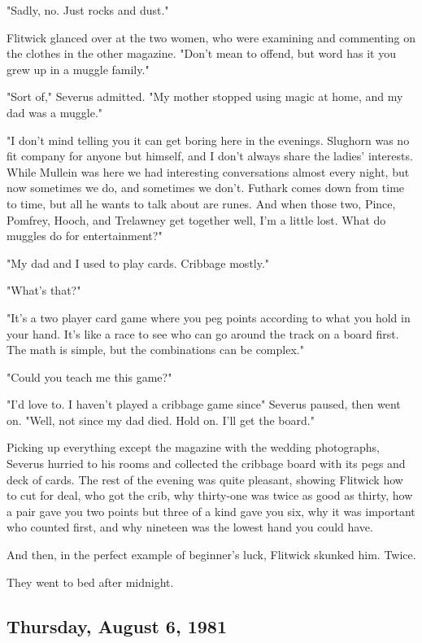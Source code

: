 "Sadly, no. Just rocks and dust."

Flitwick glanced over at the two women, who were examining and commenting on the clothes in the other magazine. "Don't mean to offend, but word has it you grew up in a muggle family."

"Sort of," Severus admitted. "My mother stopped using magic at home, and my dad was a muggle."

"I don't mind telling you it can get boring here in the evenings. Slughorn was no fit company for anyone but himself, and I don't always share the ladies' interests. While Mullein was here we had interesting conversations almost every night, but now sometimes we do, and sometimes we don't. Futhark comes down from time to time, but all he wants to talk about are runes. And when those two, Pince, Pomfrey, Hooch, and Trelawney get together{\el} well, I'm a little lost. What do muggles do for entertainment?"

"My dad and I used to play cards. Cribbage mostly."

"What's that?"

"It's a two player card game where you peg points according to what you hold in your hand. It's like a race to see who can go around the track on a board first. The math is simple, but the combinations can be complex."

"Could you teach me this game?"

"I'd love to. I haven't played a cribbage game since{\el}" Severus paused, then went on. "Well, not since my dad died. Hold on. I'll get the board."

Picking up everything except the magazine with the wedding photographs, Severus hurried to his rooms and collected the cribbage board with its pegs and deck of cards. The rest of the evening was quite pleasant, showing Flitwick how to cut for deal, who got the crib, why thirty-one was twice as good as thirty, how a pair gave you two points but three of a kind gave you six, why it was important who counted first, and why nineteen was the lowest hand you could have.

And then, in the perfect example of beginner's luck, Flitwick skunked him. Twice.

They went to bed after midnight.

\subsection{Thursday, August 6, 1981}

